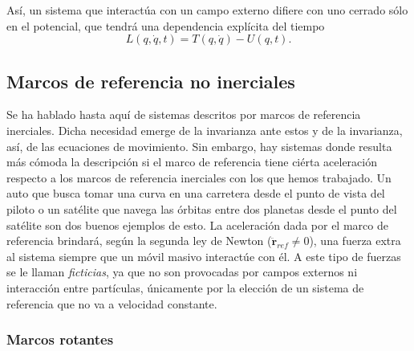 Así, un sistema que interactúa con un campo externo difiere con uno cerrado sólo en el potencial, que tendrá una dependencia explícita del tiempo
\begin{equation}
 L(q,\dot{q},t) = T(q,\dot{q}) - U(q,t).
 \label{eq:lagrangian_open_generalized}
\end{equation}

\subsection{Marcos de referencia no inerciales}
\label{sec:ficticious_forces}

Se ha hablado hasta aquí de sistemas descritos por marcos de referencia inerciales. Dicha necesidad emerge de la invarianza ante estos y de la invarianza, así, de las ecuaciones de movimiento. Sin embargo, hay sistemas donde resulta más cómoda la descripción si el marco de referencia tiene ciérta aceleración respecto a los marcos de referencia inerciales con los que hemos trabajado. Un auto que busca tomar una curva en una carretera desde el punto de vista del piloto o un satélite que navega las órbitas entre dos planetas desde el punto del satélite son dos buenos ejemplos de esto. La aceleración dada por el marco de referencia brindará, según la segunda ley de Newton ($\ddot{\mathbf{r}}_{ref} \neq 0$), una fuerza extra al sistema siempre que un móvil masivo interactúe con él. A este tipo de fuerzas se le llaman \textit{ficticias}, ya que no son provocadas por campos externos ni interacción entre partículas, únicamente por la elección de un sistema de referencia que no va a velocidad constante.

\subsubsection{Marcos rotantes}

